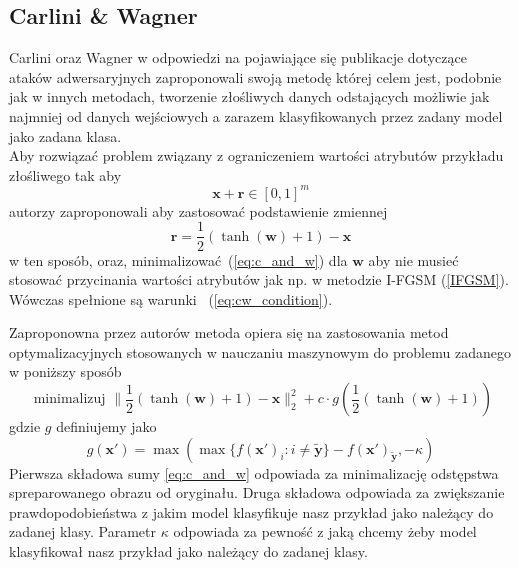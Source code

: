 \documentclass[
    left=2.5cm,         %
    right=2.5cm,        %
    top=2.5cm,          %
    bottom=3cm,         %
    bindingoffset=6mm,  %
    nohyphenation=false %
]{eiti/eiti-thesis}
\renewcommand{\vec}[1]{\mathbf{#1}}
\begin{document}
\subsection{Carlini \& Wagner}
Carlini oraz Wagner\cite{DBLP:journals/corr/CarliniW16a} w odpowiedzi na pojawiające się publikacje dotyczące
ataków adwersaryjnych zaproponowali swoją metodę której celem jest, podobnie jak w innych metodach,
tworzenie złośliwych danych
odstających możliwie jak najmniej od danych wejściowych a zarazem klasyfikowanych przez zadany model jako
zadana klasa.
\\
Aby rozwiązać problem związany z ograniczeniem wartości atrybutów przykładu złośliwego tak aby
\begin{equation}\label{eq:cw_condition}
    \vec{x}+\vec{r} \in [0,1]^m
\end{equation}
autorzy zaproponowali aby zastosować podstawienie zmiennej
\begin{equation}
    \vec{r} = \frac{1}{2}(\tanh(\vec{w})+1) - \vec{x}
\end{equation}
w ten sposób, oraz, minimalizować~(\ref{eq:c_and_w}) dla $\vec{w}$ aby nie musieć stosować przycinania wartości atrybutów jak np. w metodzie I-FGSM (\ref{IFGSM}).
Wówczas spełnione są warunki ~(\ref{eq:cw_condition}).


Zaproponowna przez autorów metoda opiera się na zastosowania metod optymalizacyjnych stosowanych w nauczaniu
maszynowym do problemu zadanego w poniższy sposób
\begin{equation}\label{eq:c_and_w}
    \text { minimalizuj } \| \frac { 1 } { 2 } ( \tanh ( \vec{w} ) + 1 ) - \vec{x} \| _ { 2 } ^ { 2 } + c \cdot g ( \frac { 1 } { 2 } ( \tanh ( \vec{w} ) + 1 ) )
\end{equation}
gdzie $g$ definiujemy jako
\begin{equation}
    g ( \vec{x'} ) = \max ( \max \{ f ( \vec{x'} ) _ { i } : i \neq \vec{\widetilde{y}} \} - f ( \vec{x'} ) _ { \vec{\widetilde{y}} } , - \kappa)
\end{equation}
Pierwsza składowa sumy \eqref{eq:c_and_w} odpowiada za minimalizację odstępstwa spreparowanego obrazu
od oryginału. Druga składowa odpowiada za zwiększanie prawdopodobieństwa z jakim model klasyfikuje nasz przykład
jako należący do zadanej klasy. Parametr \(\kappa\) odpowiada za pewność z jaką chcemy żeby model klasyfikował nasz
przykład jako należący do zadanej klasy.


\end{document}
